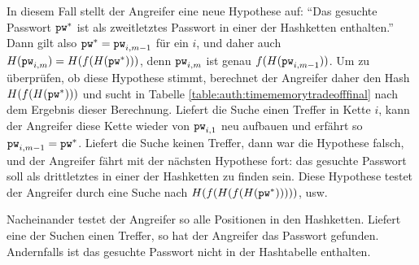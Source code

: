 In diesem Fall stellt der Angreifer eine neue Hypothese auf: "`Das
gesuchte Passwort $\texttt{pw}^*$ ist als zweitletztes Passwort in einer der
Hashketten enthalten."'  Dann gilt also $\texttt{pw}^* = \texttt{pw}_{i,m-1}$ für ein
$i$, und daher auch $H(\texttt{pw}_{i,m}) = H(f(H(\texttt{pw}^*)))$, denn $\texttt{pw}_{i,m}$
ist genau $f(H(\texttt{pw}_{i,m-1}))$.  Um zu überprüfen, ob diese Hypothese
stimmt, berechnet der Angreifer daher den Hash $H(f(H(\texttt{pw}^*)))$ und sucht in
Tabelle \ref{table:auth:timememorytradeofffinal} nach dem Ergebnis
dieser Berechnung.  Liefert die Suche einen Treffer in Kette $i$, kann
der Angreifer diese Kette wieder von $\texttt{pw}_{i,1}$ neu aufbauen und
erfährt so $\texttt{pw}_{i,m-1} = \texttt{pw}^*$.  Liefert die Suche keinen Treffer,
dann war die Hypothese falsch, und der Angreifer fährt mit der nächsten
Hypothese fort: das gesuchte Passwort soll als drittletztes in einer der
Hashketten zu finden sein.  Diese Hypothese testet der Angreifer durch
eine Suche nach $H(f(H(f(H(\texttt{pw}^*)))))$, usw.

Nacheinander testet der Angreifer so alle Positionen in den
Hashketten. Liefert eine der Suchen einen Treffer, so hat der Angreifer
das Passwort gefunden. Andernfalls ist das gesuchte Passwort nicht in
der Hashtabelle enthalten.

